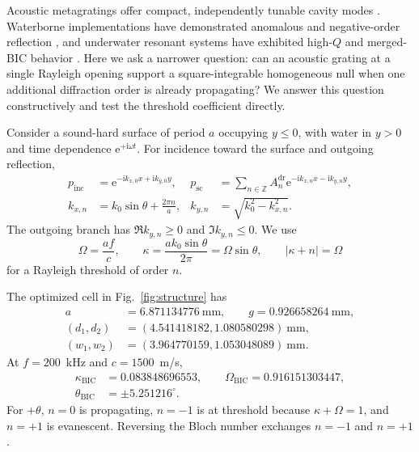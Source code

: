 \documentclass[aps,prl,reprint,superscriptaddress,nofootinbib]{revtex4-2}
\newcommand{\ii}{\mathrm{i}}
\newcommand{\e}{\mathrm{e}}
\newcommand{\BIC}{\mathrm{BIC}}
\providecommand{\dr}{\mathrm{dr}}
\begin{document}
Acoustic metagratings offer compact, independently tunable cavity modes
\cite{Assouar2018AcousticMetasurfaces,Ni2019Splitter,Torrent2018Anomalous,Jin2019Grating}.
Waterborne implementations have demonstrated anomalous and negative-order
reflection \cite{Bernard2022NegativeReflection,Fan2021Multifunctional,Cao2024UnderwaterAbnormal},
and underwater resonant systems have exhibited high-$Q$ and merged-BIC
behavior \cite{Farhat2024UltrahighQ,Yang2024MergedFP}.  Here we ask a narrower
question: can an acoustic grating at a single Rayleigh opening support a
square-integrable homogeneous null when one additional diffraction order is
already propagating?  We answer this question constructively and test the
threshold coefficient directly.

Consider a sound-hard surface of period $a$ occupying $y\leq0$, with water in
$y>0$ and time dependence $\e^{+\ii\omega t}$.  For incidence toward the
surface and outgoing reflection,
\begin{align}
 p_{\mathrm{inc}}&=\e^{-\ii k_{x,0}x+\ii k_{y,0}y},
 &p_{\mathrm{sc}}&=\sum_{n\in\mathbb Z}A_n^{\dr}
 \e^{-\ii k_{x,n}x-\ii k_{y,n}y},                                      \label{eq:fields}\\
 k_{x,n}&=k_0\sin\theta+\frac{2\pi n}{a},
 &k_{y,n}&=\sqrt{k_0^2-k_{x,n}^2}.                                      \label{eq:wavenumbers}
\end{align}
The outgoing branch has $\Re k_{y,n}\geq0$ and $\Im k_{y,n}\leq0$.  We use
\begin{equation}
 \Omega=\frac{af}{c},\qquad
 \kappa=\frac{ak_0\sin\theta}{2\pi}=\Omega\sin\theta,\qquad
 |\kappa+n|=\Omega                                                       \label{eq:rayleigh}
\end{equation}
for a Rayleigh threshold of order $n$.

The optimized cell in Fig.~\ref{fig:structure} has
\begin{align}
 a&=6.871134776~\mathrm{mm},\qquad
 g=0.926658264~\mathrm{mm},\nonumber\\
 (d_1,d_2)&=(4.541418182,1.080580298)~\mathrm{mm},\nonumber\\
 (w_1,w_2)&=(3.964770159,1.053048089)~\mathrm{mm}.                       \label{eq:geometry}
\end{align}
At $f=200$~kHz and $c=1500$~m/s,
\begin{align}
 \kappa_{\BIC}&=0.083848696553,\qquad
 \Omega_{\BIC}=0.916151303447,\nonumber\\
 \theta_{\BIC}&=\pm5.251216^{\circ}.                              \label{eq:point}
\end{align}
For $+\theta$, $n=0$ is propagating, $n=-1$ is at threshold because
$\kappa+\Omega=1$, and $n=+1$ is evanescent.  Reversing the Bloch number
exchanges $n=-1$ and $n=+1$.
\end{document}
